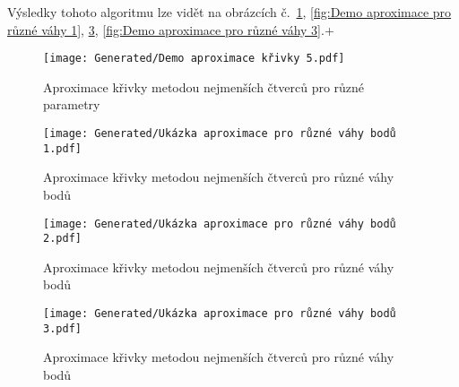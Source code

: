 Výsledky tohoto algoritmu lze vidět na obrázcích č.~\ref{fig:Demo aproximace křivky 5}, \ref{fig:Demo aproximace pro
    různé váhy 1}, \ref{fig:Demo aproximace pro různé váhy 2}, \ref{fig:Demo
    aproximace pro různé váhy 3}.+
\begin{imagepage}
    \begin{figure}[H]
        \centering
        \texttt{[image: Generated/Demo aproximace křivky 5.pdf]}
        \caption{Aproximace křivky metodou nejmenších čtverců pro různé parametry}
        \label{fig:Demo aproximace křivky 5}
    \end{figure}
    \begin{figure}[H]
        \centering
        \texttt{[image: Generated/Ukázka aproximace pro různé váhy bodů 1.pdf]}
        \caption{Aproximace křivky metodou nejmenších čtverců pro různé váhy bodů}
        \label{fig:Demo aproximace pro různé váhy 1}
    \end{figure}
\end{imagepage}

\begin{imagepage}
    \begin{figure}[H]
        \centering
        \texttt{[image: Generated/Ukázka aproximace pro různé váhy bodů 2.pdf]}
        \caption{Aproximace křivky metodou nejmenších čtverců pro různé váhy bodů}
        \label{fig:Demo aproximace pro různé váhy 2}
    \end{figure}
    \begin{figure}[H]
        \centering
        \texttt{[image: Generated/Ukázka aproximace pro různé váhy bodů 3.pdf]}
        \caption{Aproximace křivky metodou nejmenších čtverců pro různé váhy bodů}
        \label{fig:Demo aproximace pro různé váhy 3}
    \end{figure}
\end{imagepage}